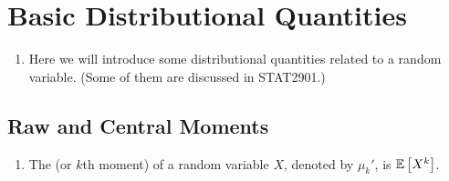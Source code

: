 \section{Basic Distributional Quantities}
\label{sect:dist-quantities}
\begin{enumerate}
\item Here we will introduce some distributional quantities related to a random
variable.  (Some of them are discussed in STAT2901.)
\end{enumerate}
\subsection{Raw and Central Moments}
\begin{enumerate}
\item The  (or \(k\)th moment) of a random variable
\(X\), denoted by \(\mu_k'\), is \(\mathbb{E}\left[X^k\right]\).


\end{enumerate}
